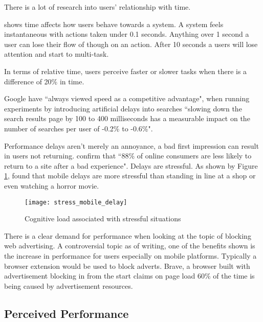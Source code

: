 There is a lot of research into users' relationship with time.

\cite{usability_engineering} shows time affects how users behave towards a system. A system feels instantaneous with actions taken under 0.1 seconds. Anything over 1 second a user can lose their flow of though on an action. After 10 seconds a users will lose attention and start to multi-task.

In terms of relative time, users perceive faster or slower tasks when there is a difference of 20\% in time. \cite{setting_a_performance_budget}

Google have ``always viewed speed as a competitive advantage", when running experiments by introducing artificial delays into searches ``slowing down the search results page by 100 to 400 milliseconds has a measurable impact on the number of searches per user of -0.2\% to -0.6\%". \cite{speed_matters}

Performance delays aren't merely an annoyance, a bad first impression can result in users not returning. \cite{why_web_performance_matters} confirm that ``88\% of online consumers are less likely to return to a site after a bad experience". Delays are stressful. As shown by Figure \ref{figure-stress-mobile-delay}, \cite{ericsson} found that mobile delays are more stressful than standing in line at a shop or even watching a horror movie.

\begin{figure}[H]
  \centering
    \texttt{[image: stress\_mobile\_delay]}
  \caption{Cognitive load associated with stressful situations \protect\cite{ericsson}}
  \label{figure-stress-mobile-delay}
\end{figure}

There is a clear demand for performance when looking at the topic of blocking web advertising. A controversial topic as of writing, one of the benefits shown is the increase in performance for users especially on mobile platforms. Typically a browser extension would be used to block adverts. Brave, a browser built with advertisement blocking in from the start claims on page load 60\% of the time is being caused by advertisement resources. \cite{brave}

\subsection{Perceived Performance} \label{l-r--perceived-performance}

